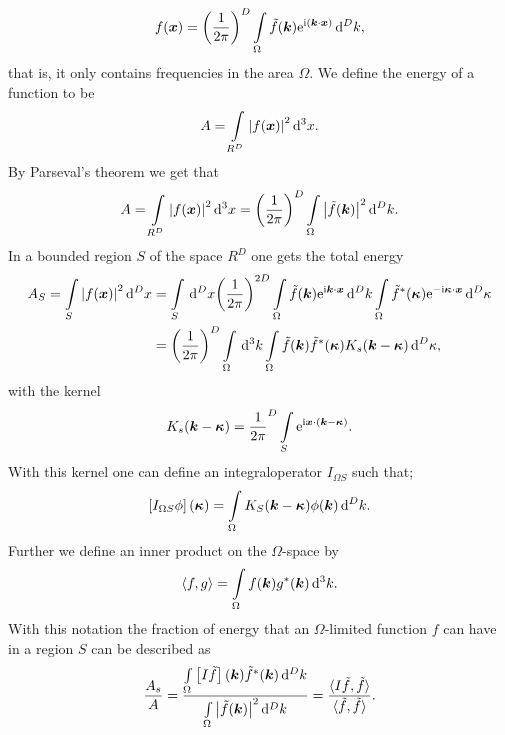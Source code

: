 \documentclass[11pt,a4paper, 
english, swedish %
]{article}
\begin{document}
\begin{equation}
  f(\vb*x)=\qty(\frac{1}{2\pi})^D\int_\Omega \tilde{f}(\vb*k)\ee^{\ii(\vb*k \cdot \vb*x)} \id^Dk,
\end{equation}
that is, it only contains frequencies in the area $\Omega$.
We define the energy of a function to be
\begin{equation*}
A=\int_{R^D}\abs{f(\vb*x)}^2\id^3x.
\end{equation*}
By Parseval's theorem we get that
\begin{equation*}
A=\int_{R^D}\abs{f(\vb*x)}^2\id^3x=\qty(\frac{1}{2\pi})^D \int_\Omega \abs{\tilde{f}(\vb*k)}^2 \id^Dk.
\end{equation*}
In a bounded region $S$ of the space $R^D$ one gets the total energy
\begin{align*}
  A_S=\int_S\abs{f(\vb*x)}^2\id^Dx&=\int_S\id^Dx \qty(\frac{1}{2\pi})^{2D}\int_\Omega \tilde{f}(\vb*k)\ee^{\ii\vb*k\cdot \vb*x}\id^Dk \int_\Omega \tilde{f}^*(\vb*\kappa)\ee^{-\ii\vb*\kappa\cdot \vb*x}\id^D\kappa\\
 & =\qty (\frac{1}{2\pi})^D \int_\Omega\id^3k\int_\Omega\tilde{f}(\vb*k)\tilde{f}^*(\vb*\kappa)K_s(\vb*k-\vb*\kappa)\id^D\kappa,
\end{align*}
with the kernel
\begin{equation}
  \label{eq:kernel}
K_s(\vb*k-\vb*\kappa)=\frac{1}{2\pi}^D\int_S\ee^{\ii\vb*x \cdot(\vb*k-\vb*\kappa)}.
\end{equation}
With this kernel one can define an integraloperator $I_{\Omega S}$ such that;
\begin{equation}
  \label{eq:int_op}
\qty[I_{\Omega S}\phi](\vb*\kappa)=\int_\Omega K_S(\vb*k-\vb*\kappa)\phi(\vb*k)\id^Dk.
\end{equation}
Further we define an inner product on the $\Omega$-space by
\begin{equation}
  \label{eq:in_prod}
   \langle f,g\rangle =\int_\Omega f(\vb*k)g^*(\vb*k)\id^3k.
\end{equation}
With this notation the fraction of energy that an $\Omega$-limited function $f$ can have in a region $S$ can be described as
\begin{equation}
  \label{eq:energy_frac_final}
\frac{A_s}{A}=\frac{\int_\Omega\qty[I\tilde{f}](\vb*k)\tilde{f}^*(\vb*k)\id^Dk}{\int_\Omega \abs{\tilde{f}(\vb*k)}^2 \id^Dk}=\frac{ \langle I\tilde{f}, \tilde{f}\rangle}{\langle \tilde{f}, \tilde{f} \rangle}.
\end{equation}
\end{document}
